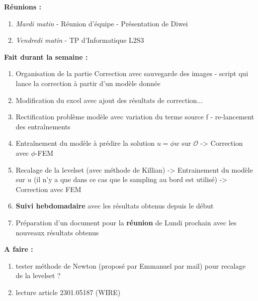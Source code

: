 \textbf{Réunions :}
\begin{enumerate}[label=\textbullet]
	\item \textit{Mardi matin} - Réunion d'équipe - Présentation de Diwei
	\item \textit{Vendredi matin} - TP d'Informatique L2S3
\end{enumerate}
\textbf{Fait durant la semaine :}
\begin{enumerate}[label=\textbullet]
	\item Organisation de la partie Correction avec sauvegarde des images - script qui lance la correction à partir d’un modèle donnée
	\item Modification du excel avec ajout des résultats de correction...
	\item Rectification problème modèle avec variation du terme source f - re-lancement des entraînements
	\item Entraînement du modèle à prédire la solution $u=\phi w$ sur $\mathcal{O}$ -> Correction avec $\phi$-FEM
	\item Recalage de la levelset (avec méthode de Killian) -> Entrainement du modèle sur $u$ (il n'y a que dans ce cas que le sampling au bord est utilisé) -> Correction avec FEM
	\item \textbf{Suivi hebdomadaire} avec les résultats obtenus depuis le début
	\item Préparation d'un document pour la \textbf{réunion} de Lundi prochain avec les nouveaux résultats obtenus
\end{enumerate}

\textbf{A faire :}
\begin{enumerate}[label=\textbullet]
	\item tester méthode de Newton (proposé par Emmanuel par mail) pour recalage de la levelset ?
	\item lecture article 2301.05187 (WIRE)
\end{enumerate}
